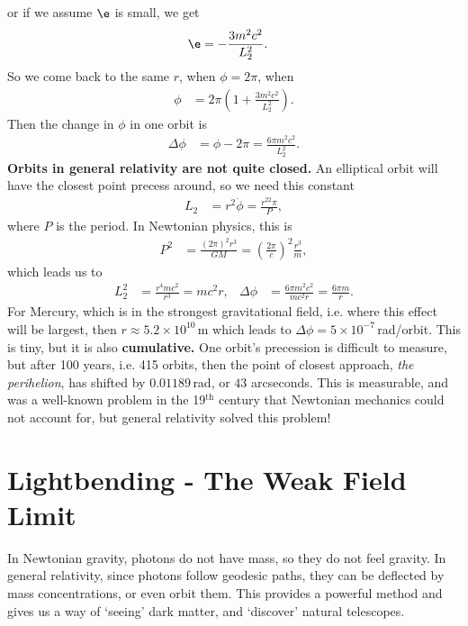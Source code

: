 \documentclass[a4paper, 11pt, normalem]{report}
\begin{document}
or if we assume $\e$ is small, we get
\begin{align}
    \e &= -\frac{3m^2c^2}{L_2^2}.
\end{align}
So we come back to the same $r$,  when $\phi=2\pi$,  when
\begin{align}
    \phi &= 2\pi\left(1+\frac{3m^2c^2}{L_2^2}\right).
\end{align}
Then the change in $\phi$ in one orbit is
\begin{align}
    \Delta\phi &= \phi-2\pi = \frac{6\pi m^2c^2}{L_2^2}.
\end{align}
\textbf{Orbits in general relativity are not quite closed.}
An elliptical orbit will have the closest point precess around, so we need this constant
\begin{align}
    L_2 &= r^2\dot{\phi} = \frac{r^22\pi}{P},
\end{align}
where $P$ is the period. 
In Newtonian physics, this is
\begin{align}
    P^2 &= \frac{(2\pi)^2r^3}{GM} = \left(\frac{2\pi}{c}\right)^2\frac{r^3}{m},
\end{align}
which leads us to
\begin{align}
    L_2^2 &= \frac{r^4mc^2}{r^3} = mc^2r, & \Delta\phi &= \frac{6\pi m^2c^2}{mc^2r} = \frac{6\pi m}{r}.
\end{align}
For Mercury, which is in the strongest gravitational field, i.e. where this effect will be largest, then $r\approx5.2\times10^{10}\,$m which leads to $\Delta\phi=5\times10^{-7}\,$rad/orbit. 
This is tiny, but it is also \textbf{cumulative.}
One orbit's precession is difficult to measure, but after 100 years, i.e. 415 orbits, then the point of closest approach, \emph{the perihelion}, has shifted by $0.01189\,$rad, or $43$ arcseconds. 
This is measurable, and was a well-known problem in the 19$^{\text{th}}$ century that Newtonian mechanics could not account for, but general relativity solved this problem!

\chapter{Lightbending - The Weak Field Limit}
In Newtonian gravity, photons do not have mass, so they do not feel gravity. 
In general relativity, since photons follow geodesic paths, they can be deflected by mass concentrations, or even orbit them. 
This provides a powerful method and gives us a way of `seeing' dark matter, and `discover' natural telescopes. 
\end{document}

